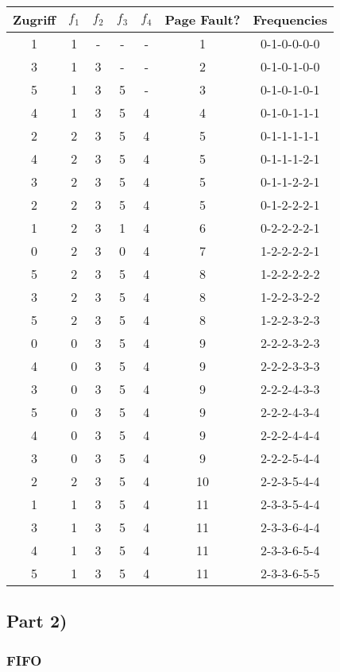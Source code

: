 \documentclass[10pt,a4paper]{article}
\begin{document}
\begin{tabular}{c|c|c|c|c|c|c}
  Zugriff & $f_{1}$ & $f_{2}$ & $f_{3}$ & $f_{4}$ & Page Fault? & Frequencies\\\hline
  1 & 1 & - & - & - & 1 & 0-1-0-0-0-0\\
  3 & 1 & 3 & - & - & 2 & 0-1-0-1-0-0\\
  5 & 1 & 3 & 5 & - & 3 & 0-1-0-1-0-1\\
  4 & 1 & 3 & 5 & 4 & 4 & 0-1-0-1-1-1\\
  2 & 2 & 3 & 5 & 4 & 5 & 0-1-1-1-1-1\\
  4 & 2 & 3 & 5 & 4 & 5 & 0-1-1-1-2-1\\
  3 & 2 & 3 & 5 & 4 & 5 & 0-1-1-2-2-1\\
  2 & 2 & 3 & 5 & 4 & 5 & 0-1-2-2-2-1\\
  1 & 2 & 3 & 1 & 4 & 6 & 0-2-2-2-2-1\\
  0 & 2 & 3 & 0 & 4 & 7 & 1-2-2-2-2-1\\
  5 & 2 & 3 & 5 & 4 & 8 & 1-2-2-2-2-2\\
  3 & 2 & 3 & 5 & 4 & 8 & 1-2-2-3-2-2\\
  5 & 2 & 3 & 5 & 4 & 8 & 1-2-2-3-2-3\\
  0 & 0 & 3 & 5 & 4 & 9 & 2-2-2-3-2-3\\
  4 & 0 & 3 & 5 & 4 & 9 & 2-2-2-3-3-3\\
  3 & 0 & 3 & 5 & 4 & 9 & 2-2-2-4-3-3\\
  5 & 0 & 3 & 5 & 4 & 9 & 2-2-2-4-3-4\\
  4 & 0 & 3 & 5 & 4 & 9 & 2-2-2-4-4-4\\
  3 & 0 & 3 & 5 & 4 & 9 & 2-2-2-5-4-4\\
  2 & 2 & 3 & 5 & 4 & 10 & 2-2-3-5-4-4\\
  1 & 1 & 3 & 5 & 4 & 11 & 2-3-3-5-4-4\\
  3 & 1 & 3 & 5 & 4 & 11 & 2-3-3-6-4-4\\
  4 & 1 & 3 & 5 & 4 & 11 & 2-3-3-6-5-4\\
  5 & 1 & 3 & 5 & 4 & 11 & 2-3-3-6-5-5
\end{tabular}

\subsection*{Part 2)}

\subsubsection*{FIFO}
\end{document}
